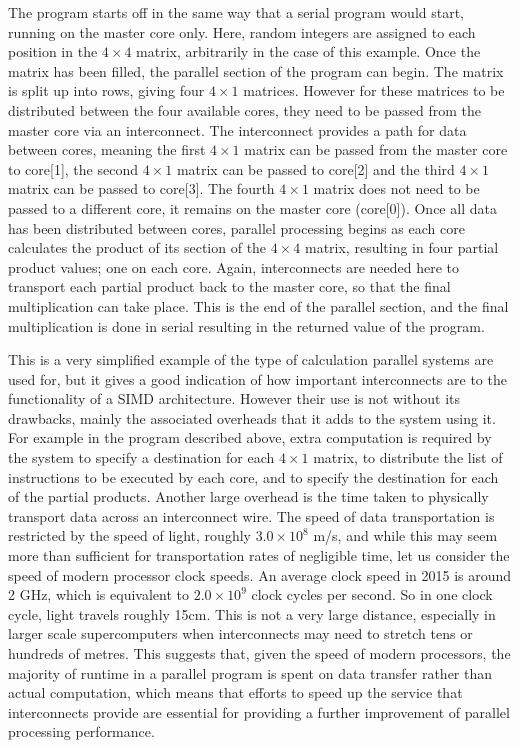 \documentclass[a4paper, 12pt]{article}
\begin{document}
The program starts off in the same way that a serial program would start, running on the master core only. Here, random integers are assigned to each position in the $4 \times 4$ matrix, arbitrarily in the case of this example. Once the matrix has been filled, the parallel section of the program can begin. The matrix is split up into rows, giving four $4 \times 1$ matrices. However for these matrices to be distributed between the four available cores, they need to be passed from the master core via an interconnect. The interconnect provides a path for data between cores, meaning the first $4 \times 1$ matrix can be passed from the master core to core[1], the second $4 \times 1$ matrix can be passed to core[2] and the third $4 \times 1$ matrix can be passed to core[3]. The fourth $4 \times 1$ matrix does not need to be passed to a different core, it remains on the master core (core[0]). Once all data has been distributed between cores, parallel processing begins as each core calculates the product of its section of the $4 \times 4$ matrix, resulting in four partial product values; one on each core. Again, interconnects are needed here to transport each partial product back to the master core, so that the final multiplication can take place. This is the end of the parallel section, and the final multiplication is done in serial resulting in the returned value of the program.

This is a very simplified example of the type of calculation parallel systems are used for, but it gives a good indication of how important interconnects are to the functionality of a SIMD architecture. However their use is not without its drawbacks, mainly the associated overheads that it adds to the system using it. For example in the program described above, extra computation is required by the system to specify a destination for each $4 \times 1$ matrix, to distribute the list of instructions to be executed by each core, and to specify the destination for each of the partial products. Another large overhead is the time taken to physically transport data across an interconnect wire. The speed of data transportation is restricted by the speed of light, roughly $3.0 \times 10^8$ m/s, and while this may seem more than sufficient for transportation rates of negligible time, let us consider the speed of modern processor clock speeds. An average clock speed in 2015 is around 2 GHz, which is equivalent to $2.0 \times 10^9$ clock cycles per second. So in one clock cycle, light travels roughly 15cm. This is not a very large distance, especially in larger scale supercomputers when interconnects may need to stretch tens or hundreds of metres. This suggests that, given the speed of modern processors, the majority of runtime in a parallel program is spent on data transfer rather than actual computation, which means that efforts to speed up the service that interconnects provide are essential for providing a further improvement of parallel processing performance.
\end{document}
